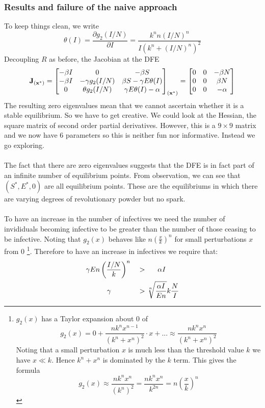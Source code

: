\subsubsection{Results and failure of the naive approach}
To keep things clean, we write \[\theta(I)=\frac{\partial g_2(I/N)}{\partial I}=\frac{k^n n (I/N)^n}{I(k^n+(I/N)^n)^2}\]
Decoupling $R$ as before, the Jacobian at the DFE
\[
\bf{J}_{(\bf{x}^*)}
={\begin{bmatrix}
	{-\beta I} &
	{0} &
	{-\beta S} \cr 
	{-\beta I} & 
	{-\gamma g_2(I/N)} & 
	{\beta S-\gamma E\theta(I)} \cr 
	{0} & 
	{\theta g_2(I/N)} & 
	{\gamma E \theta(I)-\alpha}
	\end{bmatrix}}
_{(\bf{x}^*)}
={\begin{bmatrix}
	{0} &
	{0} &
	{-\beta N} \cr 
	{0} & 
	{0} & 
	{\beta N} \cr 
	{0} & 
	{0} & 
	{-\alpha}
	\end{bmatrix}}
\] 
The resulting zero eigenvalues mean that we cannot ascertain whether it is a stable equilibrium. So we have to get creative. We could look at the Hessian, the square matrix of second order partial derivatives. However, this is a $9\times9$ matrix and we now have 6 parameters so this is neither fun nor informative. Instead we go exploring.\\
\\
The fact that there are zero eigenvalues suggests that the DFE is in fact part of an infinite number of equilibrium points. From observation, we can see that $(S^*,E^*,0)$ are all equilibrium points. These are the equilibriums in which there are varying degrees of revolutionary powder but no spark.\\
\\
To have an increase in the number of infectives we need the number of invididuals becoming infective to be greater than the number of those ceasing to be infective. Noting that $g_2(x)$ behaves like $n(\frac{x}{k})^n$ for small perturbations $x$ from $0$
\footnote{$g_2(x)$ has a Taylor expansion about $0$ of
\[g_2(x)=0+\frac{nk^nx^{n-1}}{(k^n+x^n)^2}\cdot x+...\approx \frac{nk^nx^{n}}{(k^n+x^n)^2}\] Noting that a small perturbation $x$ is much less than the threshold value $k$ we have $x\ll k$. Hence $k^n+x^n$ is dominated by the $k$ term. This gives the formula \[g_2(x)\approx\frac{nk^nx^n}{(k^n)^2}=\frac{nk^nx^{n}}{k^{2n}}=n\left(\frac{x}{k}\right)^n\]}. Therefore to have an increase in infectives we require that:
\begin{alignat}{2}
\gamma E n &\left( \frac{I/N}{k} \right)^n &&> \hspace{1.5em}\alpha I\label{eq:gamma-1}\\
&\hspace{1em}\gamma &&> \sqrt[n]{\frac{\alpha I}{E n}}k\frac{N}{I}\label{eq:gamma-2}
\end{alignat}
